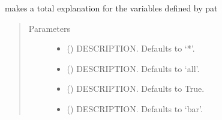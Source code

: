 \documentclass[letterpaper,10pt,english]{sphinxmanual}
\begin{document}
\begin{fulllineitems}
\begin{fulllineitems}
\label{\detokenize{core/modelclass:modelclass.Dekomp_Mixin.totexplain}}
\pysigstartsignatures
{}
\pysigstopsignatures
\sphinxAtStartPar
makes a total explanation for the variables defined by pat
\begin{quote}\begin{description}
\item[{Parameters}] \leavevmode\begin{itemize}
\item {} 
\sphinxAtStartPar
{} (\sphinxstyleliteralemphasis{\sphinxupquote{, }}) \textendash{} DESCRIPTION. Defaults to ‘*’.

\item {} 
\sphinxAtStartPar
{} (\sphinxstyleliteralemphasis{\sphinxupquote{, }}) \textendash{} DESCRIPTION. Defaults to ‘all’.

\item {} 
\sphinxAtStartPar
{} (\sphinxstyleliteralemphasis{\sphinxupquote{, }}) \textendash{} DESCRIPTION. Defaults to True.

\item {} 
\sphinxAtStartPar
{} (\sphinxstyleliteralemphasis{\sphinxupquote{, }}) \textendash{} DESCRIPTION. Defaults to ‘bar’.


\end{itemize}
\end{description}
\end{quote}
\end{fulllineitems}
\end{fulllineitems}
\end{document}
